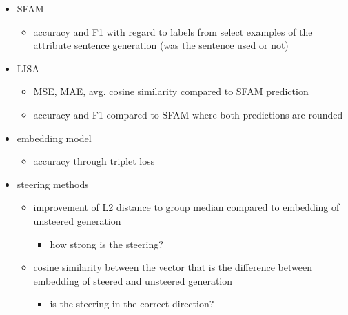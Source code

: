 \begin{itemize}
  \item SFAM
        \begin{itemize}
          \item accuracy and F1 with regard to labels from select examples of the attribute sentence generation (was the sentence used or not)
        \end{itemize}
  \item LISA
        \begin{itemize}
          \item MSE, MAE, avg. cosine similarity compared to SFAM prediction
          \item accuracy and F1 compared to SFAM where both predictions are rounded
        \end{itemize}
  \item embedding model
        \begin{itemize}
          \item accuracy through triplet loss
        \end{itemize}
  \item steering methods
        \begin{itemize}
          \item improvement of L2 distance to group median compared to embedding of unsteered generation
                \begin{itemize}
                  \item how strong is the steering?
                \end{itemize}
          \item cosine similarity between the vector that is the difference between embedding of steered and unsteered generation
                \begin{itemize}
                  \item is the steering in the correct direction?
                \end{itemize}
        \end{itemize}
\end{itemize}


